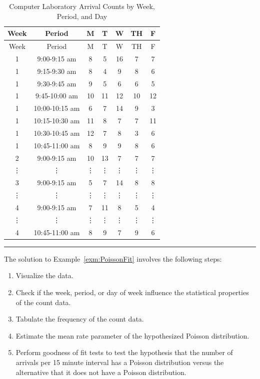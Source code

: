 \documentclass[
]{book}
\theoremstyle{definition}
\theoremstyle{definition}
\theoremstyle{definition}
\theoremstyle{definition}
\theoremstyle{remark}
\begin{document}
\hypertarget{tab:CLAdata}{}
\begin{longtable}[]{@{}ccccccc@{}}
\caption{\label{tab:CLAdata} Computer Laboratory Arrival Counts by Week, Period, and Day}\tabularnewline
\toprule
Week & Period & M & T & W & TH & F \\
\midrule
\endfirsthead
\toprule
Week & Period & M & T & W & TH & F \\
\midrule
\endhead
1 & 9:00-9:15 am & 8 & 5 & 16 & 7 & 7 \\
1 & 9:15-9:30 am & 8 & 4 & 9 & 8 & 6 \\
1 & 9:30-9:45 am & 9 & 5 & 6 & 6 & 5 \\
1 & 9:45-10:00 am & 10 & 11 & 12 & 10 & 12 \\
1 & 10:00-10:15 am & 6 & 7 & 14 & 9 & 3 \\
1 & 10:15-10:30 am & 11 & 8 & 7 & 7 & 11 \\
1 & 10:30-10:45 am & 12 & 7 & 8 & 3 & 6 \\
1 & 10:45-11:00 am & 8 & 9 & 9 & 8 & 6 \\
2 & 9:00-9:15 am & 10 & 13 & 7 & 7 & 7 \\
⋮ & ⋮ & ⋮ & ⋮ & ⋮ & ⋮ & ⋮ \\
3 & 9:00-9:15 am & 5 & 7 & 14 & 8 & 8 \\
⋮ & ⋮ & ⋮ & ⋮ & ⋮ & ⋮ & ⋮ \\
4 & 9:00-9:15 am & 7 & 11 & 8 & 5 & 4 \\
⋮ & ⋮ & ⋮ & ⋮ & ⋮ & ⋮ & ⋮ \\
4 & 10:45-11:00 am & 8 & 9 & 7 & 9 & 6 \\
\bottomrule
\end{longtable}

\begin{center}\rule{0.5\linewidth}{0.5pt}\end{center}

The solution to Example~\ref{exm:PoissonFit} involves the following steps:

\begin{enumerate}
\def\labelenumi{\arabic{enumi}.}
\item
  Visualize the data.
\item
  Check if the week, period, or day of week influence the statistical
  properties of the count data.
\item
  Tabulate the frequency of the count data.
\item
  Estimate the mean rate parameter of the hypothesized Poisson
  distribution.
\item
  Perform goodness of fit tests to test the hypothesis that the number
  of arrivals per 15 minute interval has a Poisson distribution versus
  the alternative that it does not have a Poisson distribution.
\end{enumerate}
\end{document}
